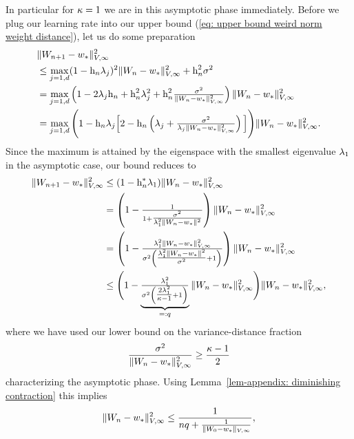 In particular for \(\kappa=1\) we are in this asymptotic phase immediately.
Before we plug our learning rate into our upper bound (\ref{eq: upper bound
weird norm weight distance}), let us do some preparation 
\begin{align}
	\nonumber
	&\|W_{n+1} -w_*\|_{V,\infty}^2\\
	\nonumber
	&\le \max_{j=1,d} (1-\text{h}_n\lambda_j)^2\|W_n -w_*\|_{V,\infty}^2
	+ \text{h}_n^2 \sigma^2\\
	\label{eq: upper bound useful for rate of convergence}
	&= \max_{j=1,d}\left(1- 2\lambda_j\text{h}_n + \text{h}_n^2\lambda_j^2
		+\text{h}_n^2\tfrac{\sigma^2}{\|W_n-w_*\|_{V,\infty}^2}
	\right)\|W_n-w_*\|_{V,\infty}^2\\
	\nonumber
	&= \max_{j=1,d}\Bigg(1- \text{h}_n \lambda_j\Big[2 - \text{h}_n \left(
		\lambda_j + \tfrac{\sigma^2}{\lambda_j\|W_n-w_*\|_{V,\infty}^2}
	\right)\Big] \Bigg)\|W_n-w_*\|_{V,\infty}^2.
\end{align}
Since the maximum is attained by the eigenspace with the smallest eigenvalue \(\lambda_1\)
in the asymptotic case, our bound reduces to
\begin{align*}
	\|W_{n+1} -w_*\|_{V,\infty}^2
	&\le (1- \text{h}_n^* \lambda_1)\|W_n-w_*\|_{V,\infty}^2\\
	&= \left(1- \tfrac{1}{1+ \tfrac{\sigma^2}{\lambda_1^2\|W_n-w_*\|^2}}\right)
	\|W_n-w_*\|_{V,\infty}^2\\
	&= \left(1- \tfrac{
		\lambda_1^2 \|W_n-w_*\|_{V,\infty}^2
	}{
		\sigma^2
		\left(\tfrac{\lambda_1^2\|W_n-w_*\|^2}{\sigma^2}+1\right)
	}\right)
	\|W_n-w_*\|_{V,\infty}^2\\
	&\le \Bigg(
	1- \underbrace{\tfrac{
		\lambda_1^2
	}{
		\sigma^2
		\left(\tfrac{2\lambda_1^2}{\kappa -1}+1\right)
	}}_{=:q}
	\|W_n-w_*\|_{V,\infty}^2
	\Bigg)
	\|W_n-w_*\|_{V,\infty}^2,
\end{align*}
where we have used our lower bound on the variance-distance fraction
\begin{align*}
	\frac{\sigma^2}{
		\|W_n-w_*\|_{V,\infty}^2
	}
	\ge \frac{\kappa-1}{2}
\end{align*}
characterizing the asymptotic phase. Using Lemma~\ref{lem-appendix: diminishing contraction}
this implies
\begin{align*}
	\|W_n-w_*\|_{V,\infty}^2
	\le \frac{1}{nq + \tfrac{1}{\|W_0-w_*\|_{V,\infty}}},
\end{align*}
